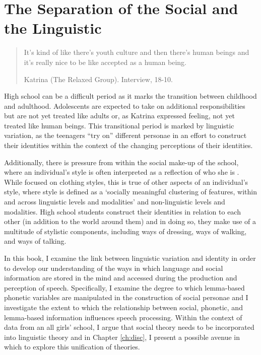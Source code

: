 \chapter{The Separation of the Social and the Linguistic}
\label{ch:litrev}


\begin{quote}
	It's kind of like there's youth culture and then there's human beings and it's really nice to be like accepted as a human being.  
	
	Katrina (The Relaxed Group). Interview, 18-10.
\end{quote}


\noindent High school can be a difficult period as it marks the transition between childhood and adulthood. Adolescents are expected to take on additional responsibilities but are not yet treated like adults or, as Katrina expressed feeling, not yet treated like human beings.  This transitional period is marked by linguistic variation, as the teenagers ``try on'' different personae in an effort to construct their identities within the context of the changing perceptions of their identities.

Additionally, there is pressure from within the social make-up of the school, where an individual's style is often interpreted as a reflection of who she is \cite[2]{pomerantz2008}.  While  focused on clothing styles, this is true of other aspects of an individual's style, where style is defined as a `socially meaningful clustering of features, within and across linguistic levels and modalities' \cite{campbellkibleretal2006} and non-linguistic levels and modalities. High school students construct their identities in relation to each other (in addition to the world around them) and in doing so, they make use of a multitude of stylistic components, including ways of dressing, ways of walking, and ways of talking.  

In this book, I examine the link between linguistic variation and identity in order to develop our understanding of the ways in which language and social information are stored in the mind and accessed during the production and perception of speech. Specifically, I examine the degree to which lemma-based phonetic variables are manipulated in the construction of social personae and I investigate the extent to which the relationship between social, phonetic, and lemma-based information influences speech processing.  Within the context of data from an all girls' school, I argue that social theory needs to be incorporated into linguistic theory and in Chapter \ref{ch:disc}, I present a possible avenue in which to explore this unification of theories.

